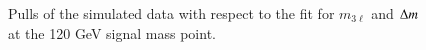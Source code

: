 \begin{figure}[H!]
\begin{minipage}[c]{\textwidth}
{		
	}
  \caption{Pulls of the simulated data with respect to the fit for $m_{3\ell}$ and $\Delta m$ at the 120 GeV signal mass point. }
  \label{fig:Pull}
\end{minipage}
\end{figure}

